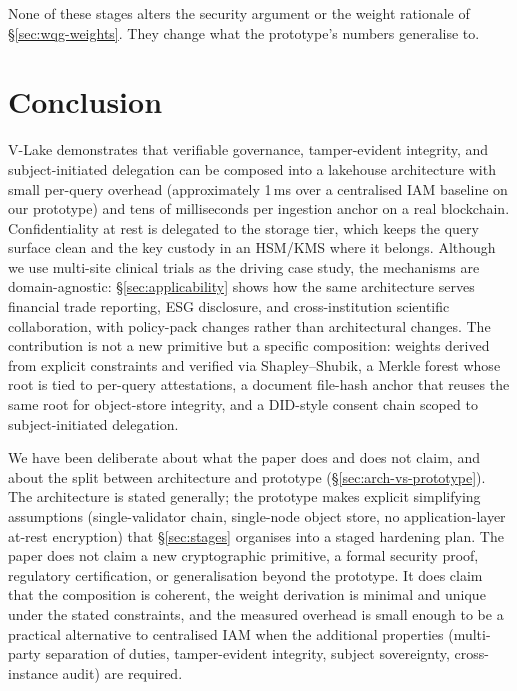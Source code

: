 \documentclass[10pt,twocolumn]{article}
\begin{document}
None of these stages alters the security argument or the weight
rationale of \S\ref{sec:wqg-weights}. They change what the
prototype's numbers generalise to.


\section{Conclusion}
\label{sec:conclusion}

V-Lake demonstrates that verifiable governance, tamper-evident
integrity, and subject-initiated delegation can be composed into
a lakehouse architecture with small per-query overhead
(approximately 1\,ms over a centralised IAM baseline on our
prototype) and tens of milliseconds per ingestion anchor on a
real blockchain. Confidentiality at rest is delegated to the
storage tier, which keeps the query surface clean and the key
custody in an HSM/KMS where it belongs. Although we use
multi-site clinical trials as the driving case study, the
mechanisms are domain-agnostic: \S\ref{sec:applicability} shows
how the same architecture serves financial trade reporting, ESG
disclosure, and cross-institution scientific collaboration, with
policy-pack changes rather than architectural changes. The
contribution is not a new primitive but a specific composition:
weights derived from explicit constraints and verified via
Shapley--Shubik, a Merkle forest whose root is tied to per-query
attestations, a document file-hash anchor that reuses the same
root for object-store integrity, and a DID-style consent chain
scoped to subject-initiated delegation.

We have been deliberate about what the paper does and does not
claim, and about the split between architecture and prototype
(\S\ref{sec:arch-vs-prototype}). The architecture is stated
generally; the prototype makes explicit simplifying assumptions
(single-validator chain, single-node object store, no
application-layer at-rest encryption) that \S\ref{sec:stages}
organises into a staged hardening plan. The paper does not claim
a new cryptographic primitive, a formal security proof,
regulatory certification, or generalisation beyond the prototype.
It does claim that the composition is coherent, the weight
derivation is minimal and unique under the stated constraints,
and the measured overhead is small enough to be a practical
alternative to centralised IAM when the additional properties
(multi-party separation of duties, tamper-evident integrity,
subject sovereignty, cross-instance audit) are required.
\end{document}
